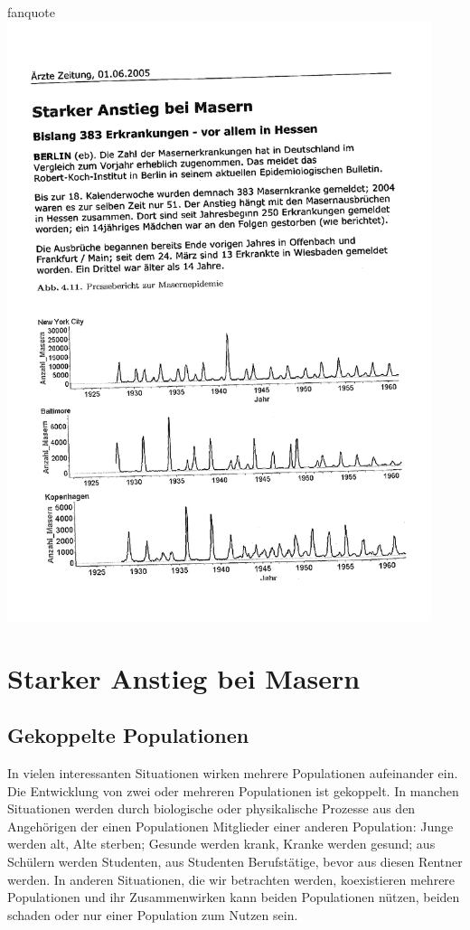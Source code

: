 \documentclass[%
<<<<<<< Updated upstream
<<<<<<< Updated upstream
11pt,%
twoside,%
titlepage,%
german,%
headsepline%
]{scrartcl}
\begin{document}
\begin{uebenv}{fanquote}
\includegraphics[width=0.93\textwidth,page=1,angle=-1.6]{pictures/starkeranstiegzeitung.pdf}

\pagebreak

\section{Starker Anstieg bei Masern}
\subsection{Gekoppelte Populationen}
In
vielen interessanten Situationen wirken mehrere Populationen aufeinander ein. Die
Entwicklung von zwei oder mehreren Populationen ist gekoppelt. In manchen Situationen werden durch biologische oder physikalische Prozesse aus den Angehörigen der einen Populationen Mitglieder einer anderen Population: Junge werden alt, Alte sterben; Gesunde werden krank, Kranke werden gesund; aus Schülern werden Studenten, aus Studenten Berufstätige, bevor aus diesen Rentner werden. In anderen Situationen, die wir betrachten werden, koexistieren mehrere Populationen und ihr Zusammenwirken kann beiden Populationen nützen, beiden schaden oder nur einer Population zum Nutzen sein.


\end{uebenv}
\end{document}
